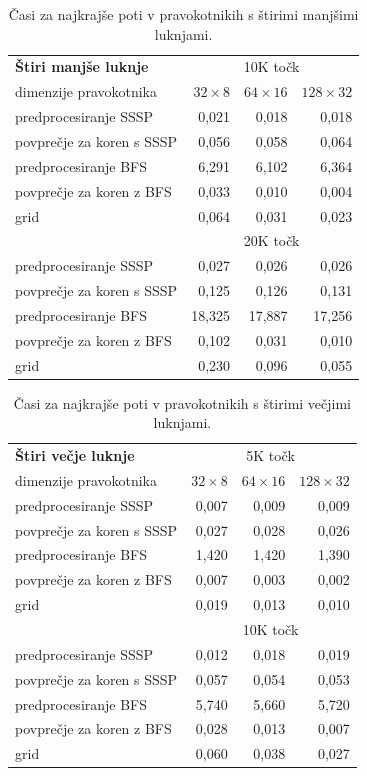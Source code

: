 \documentclass[a4paper, 12pt]{book}
\begin{document}
\begin{table}[htp]
\begin{center}
\begin{tabular}{l*{3}{r}}
\textbf{Štiri manjše luknje} & \multicolumn{3}{c}{10K točk} \\
dimenzije pravokotnika	&	$32\times 8$	&	$64\times 16$	&	$128\times 32$	\\						
\hline
predprocesiranje SSSP &	0,021	&	0,018	&	0,018	\\
povprečje za koren s SSSP	&	0,056	&	0,058	&	0,064	\\
predprocesiranje BFS	&	6,291	&	6,102	&	6,364	\\
povprečje za koren z BFS	&	0,033	&	0,010	&	0,004	\\
grid				&	0,064	&	0,031	&	0,023	\\
\hline
& \multicolumn{3}{c}{20K točk} \\
\hline
predprocesiranje SSSP &  0,027	&	0,026	&	0,026 \\
povprečje za koren s SSSP &	0,125	&	0,126	&	0,131 \\
predprocesiranje BFS &	18,325	&	17,887	&	17,256	\\
povprečje za koren z BFS & 0,102	&	0,031	&	0,010 \\
grid &	0,230	&	0,096	&	0,055 
\end{tabular}
\caption{Časi za najkrajše poti v pravokotnikih s štirimi manjšimi luknjami.}
\label{table4}
\end{center}
\end{table}

\begin{table}[htp]
\begin{center}
\begin{tabular}{l*{3}{r}}
\textbf{Štiri večje luknje} & \multicolumn{3}{c}{5K točk} \\
dimenzije pravokotnika	&	$32\times 8$	&	$64\times 16$	&	$128\times 32$ \\						
\hline
predprocesiranje SSSP	&	0,007	&	0,009	&	0,009	\\
povprečje za koren s SSSP	&	0,027	&	0,028	&	0,026	\\
predprocesiranje BFS	&	1,420	&	1,420	&	1,390	\\
povprečje za koren z BFS	&	0,007	&	0,003	&	0,002	\\
grid				&	0,019	&	0,013	&	0,010	\\
\hline
& \multicolumn{3}{c}{10K točk} \\
\hline
predprocesiranje SSSP &	0,012	&	0,018	&	0,019	\\
povprečje za koren s SSSP &	0,057	&	0,054	&	0,053	\\
predprocesiranje BFS &	5,740	&	5,660	&	5,720	\\
povprečje za koren z BFS &	0,028	&	0,013	&	0,007	\\
grid &	0,060	&	0,038	&	0,027 
\end{tabular}
\caption{Časi za najkrajše poti v pravokotnikih s štirimi večjimi luknjami.}
\label{table5}
\end{center}
\end{table}
\end{document}
